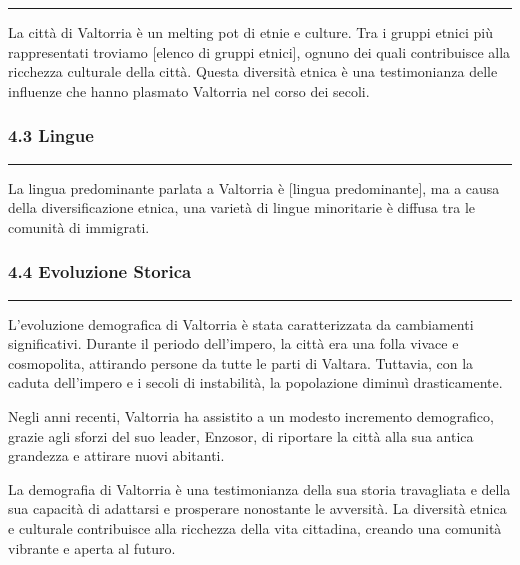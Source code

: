 \begin{center}\rule{0.5\linewidth}{0.5pt}\end{center}

La città di Valtorria è un melting pot di etnie e culture. Tra i gruppi
etnici più rappresentati troviamo {[}elenco di gruppi etnici{]}, ognuno
dei quali contribuisce alla ricchezza culturale della città. Questa
diversità etnica è una testimonianza delle influenze che hanno plasmato
Valtorria nel corso dei secoli.

\subsubsection{\texorpdfstring{4.3
\textbf{Lingue}}{4.3 Lingue}}\label{lingue}

\begin{center}\rule{0.5\linewidth}{0.5pt}\end{center}

La lingua predominante parlata a Valtorria è {[}lingua predominante{]},
ma a causa della diversificazione etnica, una varietà di lingue
minoritarie è diffusa tra le comunità di immigrati.

\subsubsection{\texorpdfstring{4.4 \textbf{Evoluzione
Storica}}{4.4 Evoluzione Storica}}\label{evoluzione-storica}

\begin{center}\rule{0.5\linewidth}{0.5pt}\end{center}

L'evoluzione demografica di Valtorria è stata caratterizzata da
cambiamenti significativi. Durante il periodo dell'impero, la città era
una folla vivace e cosmopolita, attirando persone da tutte le parti di
Valtara. Tuttavia, con la caduta dell'impero e i secoli di instabilità,
la popolazione diminuì drasticamente.

Negli anni recenti, Valtorria ha assistito a un modesto incremento
demografico, grazie agli sforzi del suo leader, Enzosor, di riportare la
città alla sua antica grandezza e attirare nuovi abitanti.

La demografia di Valtorria è una testimonianza della sua storia
travagliata e della sua capacità di adattarsi e prosperare nonostante le
avversità. La diversità etnica e culturale contribuisce alla ricchezza
della vita cittadina, creando una comunità vibrante e aperta al futuro.

